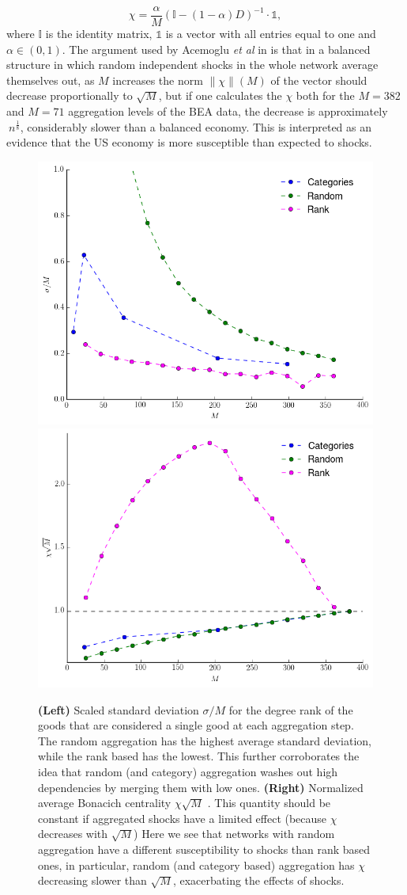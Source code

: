 \begin{equation}
  \label{eq:centrality}
  \chi = \frac{\alpha}{M}(\mathds{I} - (1-\alpha) D)^{-1}\cdot \mathds{1},
\end{equation}
where $\mathds{I}$ is the identity matrix, $\mathds{1}$ is a vector
with all entries equal to one and $\alpha \in (0,1)$. The argument
used by Acemoglu \emph{et al} in \cite{Acemoglu12} is that in a
balanced structure in which random independent shocks in the whole
network average themselves out, as $M$ increases the norm
$\|\chi\| (M)$ of the vector should decrease proportionally to $\sqrt{M}$, but if
one calculates the $\chi$ both for the $M=382$ and $M=71$ aggregation
levels of the BEA data, the decrease is approximately
$~n^{\frac{1}{8}}$, considerably slower than a balanced economy. This
is interpreted as an evidence that the US economy is more susceptible
than expected to shocks.

\begin{figure}[!ht]
  \centering
  \includegraphics[width=.48\textwidth]{figs_io/cv_degree.png}
  \includegraphics[width=.48\textwidth]{figs_io/susc_data.png}
  
  \caption{\textbf{(Left)} Scaled standard deviation $\sigma / M$ for
    the degree rank of the goods that are considered a single good at
    each aggregation step. The random aggregation has the highest
    average standard deviation, while the rank based has the
    lowest. This further corroborates the idea that random (and
    category) aggregation washes out high dependencies by merging them
    with low ones. \textbf{(Right)} Normalized average Bonacich
    centrality $\chi\sqrt{M}$ \cite{Acemoglu12}. This quantity should
    be constant if aggregated shocks have a limited effect (because
    $\chi$ decreases with $\sqrt{M}$) Here we see that networks with
    random aggregation have a different susceptibility to shocks than
    rank based ones, in particular, random (and category based)
    aggregation has $\chi$ decreasing slower than $\sqrt{M}$,
    exacerbating the effects of shocks.}
  \label{fig:chi}
\end{figure}


